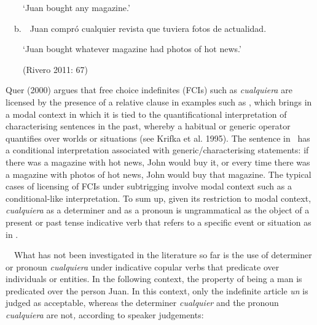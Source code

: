 \begin{styleStandard}
\ \ \ \ ‘Juan bought any magazine.’
\end{styleStandard}

\begin{styleStandard}
\ \ b.\ \ Juan compró cualquier revista que tuviera fotos de actualidad.
\end{styleStandard}

\begin{styleStandard}
\ \ \ \ ‘Juan bought whatever magazine had photos of hot news.’ 
\end{styleStandard}

\begin{styleStandard}
\ \ \ \ (Rivero 2011: 67)
\end{styleStandard}

\begin{styleStandard}
Quer (2000) argues that free choice indefinites (FCIs) such as \textit{cualquiera} are licensed by the presence of a relative clause in examples such as , which brings in a modal context in which it is tied to the quantificational interpretation of characterising sentences in the past, whereby a habitual or generic operator quantifies over worlds or situations (see Krifka et al. 1995). The sentence in \ has a conditional interpretation associated with generic/characterising statements: if there was a magazine with hot news, John would buy it, or every time there was a magazine with photos of hot news, John would buy that magazine. The typical cases of licensing of FCIs under subtrigging involve modal context such as a conditional-like interpretation. To sum up, given its restriction to modal context, \textit{cualquiera} as a determiner and as a pronoun is ungrammatical as the object of a present or past tense indicative verb that refers to a specific event or situation as in . 
\end{styleStandard}

\begin{styleStandard}
\ \ What has not been investigated in the literature so far is the use of determiner or pronoun \textit{cualquiera} under indicative copular verbs that predicate over individuals or entities. In the following context, the property of being a man is predicated over the person Juan. In this context, only the indefinite article \textit{un} is judged as acceptable, whereas the determiner \textit{cualquier} and the pronoun \textit{cualquiera} are not\textit{,} according to speaker judgements:
\end{styleStandard}

